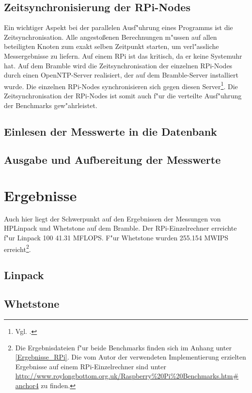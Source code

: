 \subsection{Zeitsynchronisierung der RPi-Nodes}

Ein wichtiger Aspekt bei der parallelen Ausf"uhrung eines Programms ist die Zeitsynchronisation. Alle angesto\ss enen Berechnungen m"ussen auf allen beteiligten Knoten zum exakt selben Zeitpunkt starten, um verl"assliche Messergebnisse zu liefern. Auf einem RPi ist das kritisch, da er keine Systemuhr hat. Auf dem Bramble wird die Zeitsynchronisation der einzelnen RPi-Nodes durch einen OpenNTP-Server realisiert, der auf dem Bramble-Server installiert wurde. Die einzelnen RPi-Nodes synchronisieren sich gegen diesen Server\footnote{Vgl. \cite{kli13}.}. Die Zeitsynchronisation der RPi-Nodes ist somit auch f"ur die verteilte Ausf"uhrung der Benchmarks gew"ahrleistet. 

\subsection{Einlesen der Messwerte in die Datenbank}

\subsection{Ausgabe und Aufbereitung der Messwerte}

\section{Ergebnisse}\label{Ergebnisse}

Auch hier liegt der Schwerpunkt auf den Ergebnissen der Messungen von HPLinpack und Whetstone auf dem Bramble. Der RPi-Einzelrechner erreichte f"ur Linpack 100 41.31 MFLOPS. F"ur Whetstone wurden 255.154 MWIPS erreicht\footnote{Die Ergebnisdateien f"ur beide Benchmarks finden sich im Anhang unter \ref{Ergebnisse_RPi}. Die vom Autor der verwendeten Implementierung erzielten Ergebnisse auf einem RPi-Einzelrechner sind unter \url{http://www.roylongbottom.org.uk/Raspberry\%20Pi\%20Benchmarks.htm\# anchor4} zu finden.}.

\subsection{Linpack}\label{Ergebnisse Linpack}


\subsection{Whetstone}\label{Ergebnisse Whetstone}


\endinput 


